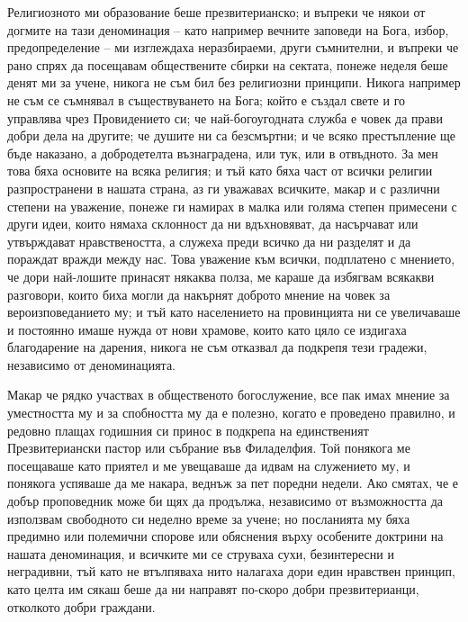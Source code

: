 \documentclass[12pt]{book}
\begin{document}
Религиозното ми образование беше презвитерианско; и въпреки че някои от догмите на тази деноминация – като например вечните заповеди на Бога, избор, предопределение – ми изглеждаха неразбираеми, други съмнителни, и въпреки че рано спрях да посещавам обществените сбирки на сектата, понеже неделя беше денят ми за учене, никога не съм бил без религиозни принципи. Никога например не съм се съмнявал в съществуването на Бога; който е създал свете и го управлява чрез Провидението си; че най-богоугодната служба е човек да прави добри дела на другите; че душите ни са безсмъртни; и че всяко престъпление ще бъде наказано, а добродетелта възнаградена, или тук, или в отвъдното. За мен това бяха основите на всяка религия; и тъй като бяха част от всички религии разпространени в нашата страна, аз ги уважавах всичките, макар и с различни степени на уважение, понеже ги намирах в малка или голяма степен примесени с други идеи, които нямаха склонност да ни вдъхновяват, да насърчават или утвърждават нравствеността, а служеха преди всичко да ни разделят и да пораждат вражди между нас. Това уважение към всички, подплатено с мнението, че дори най-лошите принасят някаква полза, ме караше да избягвам всякакви разговори, които биха могли да накърнят доброто мнение на човек за вероизповеданието му; и тъй като населението на провинцията ни се увеличаваше и постоянно имаше нужда от нови храмове, които като цяло се издигаха благодарение на дарения, никога не съм отказвал да подкрепя тези градежи, независимо от деноминацията.  

Макар че рядко участвах в общественото богослужение, все пак имах мнение за уместността му и за спобността му да е полезно, когато е проведено правилно, и редовно плащах годишния си принос в подкрепа на единственият Презвитериански пастор или събрание във Филаделфия. Той понякога ме посещаваше като приятел и ме увещаваше да идвам на служението му, и понякога успяваше да ме накара, веднъж за пет поредни недели. Ако смятах, че е добър проповедник може би щях да продължа, независимо от възможността да използвам свободното си неделно време за учене; но посланията му бяха предимно или полемични спорове или обяснения върху особените доктрини на нашата деноминация, и всичките ми се струваха сухи, безинтересни и неградивни, тъй като не втълпяваха нито налагаха дори един нравствен принцип, като целта им сякаш беше да ни направят по-скоро добри презвитерианци, отколкото добри граждани.
\end{document}

